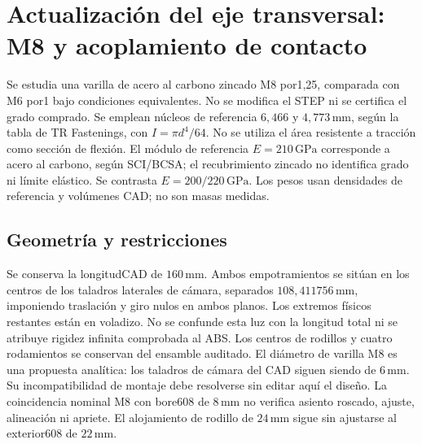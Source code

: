 \section{Actualización del eje transversal: M8 y acoplamiento de contacto}
Se estudia una varilla de acero al carbono zincado M8 por1,25, comparada con M6 por1
bajo condiciones equivalentes. No se modifica el STEP ni se certifica el grado comprado.
Se emplean núcleos de referencia $6,466$ y $4,773\,\mathrm{mm}$, según la tabla de TR Fastenings\parencite{tr_rosca_m6_2026},
con $I=\pi d^4/64$. No se utiliza el área resistente a tracción como sección de flexión.
El módulo de referencia $E=210\,\mathrm{GPa}$ corresponde a acero al carbono, según SCI/BCSA\parencite{sci_acero_elastico_2026};
el recubrimiento zincado no identifica grado ni límite elástico. Se contrasta $E=200/220\,\mathrm{GPa}$.
Los pesos usan densidades de referencia y volúmenes CAD; no son masas medidas.

\subsection{Geometría y restricciones}
Se conserva la longitudCAD de $160\,\mathrm{mm}$. Ambos empotramientos se sitúan en los centros
de los taladros laterales de cámara, separados $108,411756\,\mathrm{mm}$, imponiendo traslación y giro
nulos en ambos planos. Los extremos físicos restantes están en voladizo. No se confunde esta luz
con la longitud total ni se atribuye rigidez infinita comprobada al ABS.
Los centros de rodillos y cuatro rodamientos se conservan del ensamble auditado.
El diámetro de varilla M8 es una propuesta analítica: los taladros de cámara del CAD siguen siendo
de $6\,\mathrm{mm}$. Su incompatibilidad de montaje debe resolverse sin editar aquí el diseño.
La coincidencia nominal M8 con bore608 de $8\,\mathrm{mm}$ no verifica asiento roscado,
ajuste, alineación ni apriete. El alojamiento de rodillo de $24\,\mathrm{mm}$ sigue sin ajustarse
al exterior608 de $22\,\mathrm{mm}$.

